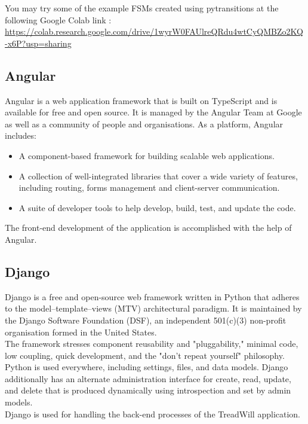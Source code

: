 \normalsize{
You may try some of the example FSMs created using pytransitions at the following Google Colab link : \url{https://colab.research.google.com/drive/1wyrW0FAUlreQRdu4wtCyQMBZo2KQ-x6P?usp=sharing}
}


\subsection{Angular}
\normalsize{
Angular is a web application framework that is built on TypeScript and is available for free and open source. It is managed by the Angular Team at Google as well as a community of people and organisations.\cite{angular}
As a platform, Angular includes:}
\begin{itemize}
    \item A component-based framework for building scalable web applications.
    \item A collection of well-integrated libraries that cover a wide variety of features, including routing, forms management and client-server communication.
    \item A suite of developer tools to help develop, build, test, and update the code.\cite{angular}
\end{itemize}

\normalsize{
The front-end development of the application is accomplished with the help of Angular.
}

\subsection{Django}
\normalsize{
Django is a free and open-source web framework written in Python that adheres to the model–template–views (MTV) architectural paradigm. It is maintained by the Django Software Foundation (DSF), an independent 501(c)(3) non-profit organisation formed in the United States.\cite{enwiki:1095293664}\\

The framework stresses component reusability and "pluggability," minimal code, low coupling, quick development, and the "don't repeat yourself" philosophy. Python is used everywhere, including settings, files, and data models. Django additionally has an alternate administration interface for create, read, update, and delete that is produced dynamically using introspection and set by admin models.\cite{enwiki:1095293664}\cite{django-docs}\\

Django is used for handling the back-end processes of the TreadWill application.
}

